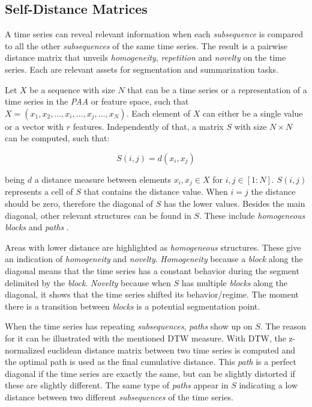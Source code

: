 \subsection{Self-Distance Matrices}
\label{subsec:dist_matrix}

A time series can reveal relevant information when each \textit{subsequence} is compared to all the other \textit{subsequences} of the same time series. The result is a pairwise distance matrix that unveils \textit{homogeneity}, \textit{repetition} and \textit{novelty} on the time series. Each are relevant assets for segmentation and summarization tasks.
\par
Let $X$ be a sequence with size $N$ that can be a time series or a representation of a time series in the \textit{PAA} or feature space, such that $X = (x_1, x_2, ..., x_i, ..., x_j, ..., x_N)$. Each element of $X$ can either be a single value or a vector with $r$ features. Independently of that, a matrix $S$ with size $N \times N$ can be computed, such that:

\begin{equation}
S(i,j)= d(x_i, x_j) 
\end{equation}

being $d$ a distance measure between elements $x_i,x_j \in X$ for $i,j \in [1:N]$. $S(i,j)$ represents a cell of $S$ that contains the distance value. When $i=j$ the distance should be zero, therefore the diagonal of $S$ has the lower values. Besides the main diagonal, other relevant structures can be found in $S$. These include \textit{homogeneous blocks} and \textit{paths} \cite{fmp, muller}. 
\par
Areas with lower distance are highlighted as \textit{homogeneous} structures. These give an indication of \textit{homogeneity} and \textit{novelty}. \textit{Homogeneity} because a \textit{block} along the diagonal means that the time series has a constant behavior during the segment delimited by the \textit{block}. \textit{Novelty} because when $S$ has multiple \textit{blocks} along the diagonal, it shows that the time series shifted its behavior/regime. The moment there is a transition between \textit{blocks} is a potential segmentation point.
\par
When the time series has repeating \textit{subsequences}, \textit{paths} show up on $S$. The reason for it can be illustrated with the mentioned DTW measure. With DTW, the z-normalized euclidean distance matrix between two time series is computed and the optimal path is used as the final cumulative distance. This \textit{path} is a perfect diagonal if the time series are exactly the same, but can be slightly distorted if these are slightly different. The same type of \textit{paths} appear in $S$ indicating a low distance between two different \textit{subsequences} of the time series.


